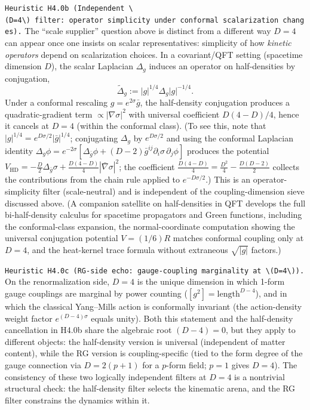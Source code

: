 \documentclass[
]{article}
\begin{document}
\texttt{Heuristic\ H4.0b\ (Independent\ \textbackslash{}(D=4\textbackslash{})\ filter:\ operator\ simplicity\ under\ conformal\ scalarization\ changes).}
The ``scale supplier'' question above is distinct from a different way
\(D=4\) can appear once one insists on scalar representatives:
simplicity of how \emph{kinetic operators} depend on scalarization
choices. In a covariant/QFT setting (spacetime dimension \(D\)), the
scalar Laplacian \(\Delta_g\) induces an operator on half-densities by
conjugation, \[
\widetilde\Delta_g := |g|^{1/4}\Delta_g|g|^{-1/4}.
\] Under a conformal rescaling \(g=e^{2\sigma}\bar g\), the half-density
conjugation produces a quadratic-gradient term
\(\propto |\nabla\sigma|^2\) with universal coefficient \(D(4-D)/4\),
hence it cancels at \(D=4\) (within the conformal class). (To see this,
note that \(|g|^{1/4}=e^{D\sigma/2}|\bar g|^{1/4}\); conjugating
\(\Delta_g\) by \(e^{D\sigma/2}\) and using the conformal Laplacian
identity
\(\Delta_g\phi=e^{-2\sigma}[\Delta_{\bar g}\phi+(D{-}2)\bar g^{ij}\partial_i\sigma\,\partial_j\phi]\)
produces the potential
\(V_{\mathrm{HD}}=-\tfrac{D}{2}\Delta_{\bar g}\sigma+\tfrac{D(4-D)}{4}|\bar\nabla\sigma|^2\);
the coefficient \(\tfrac{D(4-D)}{4}=\tfrac{D^2}{4}-\tfrac{D(D-2)}{2}\)
collects the contributions from the chain rule applied to
\(e^{-D\sigma/2}\).) This is an operator-simplicity filter
(scale-neutral) and is independent of the coupling-dimension sieve
discussed above. (A companion satellite on half-densities in QFT
develops the full bi-half-density calculus for spacetime propagators and
Green functions, including the conformal-class expansion, the
normal-coordinate computation showing the universal conjugation
potential \(V=(1/6)R\) matches conformal coupling only at \(D=4\), and
the heat-kernel trace formula without extraneous \(\sqrt{|g|}\)
factors.)

\texttt{Heuristic\ H4.0c\ (RG-side\ echo:\ gauge-coupling\ marginality\ at\ \textbackslash{}(D=4\textbackslash{})).}
On the renormalization side, \(D=4\) is the unique dimension in which
1-form gauge couplings are marginal by power counting
(\([g^2]=\text{length}^{D-4}\)), and in which the classical Yang--Mills
action is conformally invariant (the action-density weight factor
\(e^{(D-4)\sigma}\) equals unity). Both this statement and the
half-density cancellation in H4.0b share the algebraic root \((D-4)=0\),
but they apply to different objects: the half-density version is
universal (independent of matter content), while the RG version is
coupling-specific (tied to the form degree of the gauge connection via
\(D=2(p+1)\) for a \(p\)-form field; \(p=1\) gives \(D=4\)). The
consistency of these two logically independent filters at \(D=4\) is a
nontrivial structural check: the half-density filter selects the
kinematic arena, and the RG filter constrains the dynamics within it.
\end{document}
